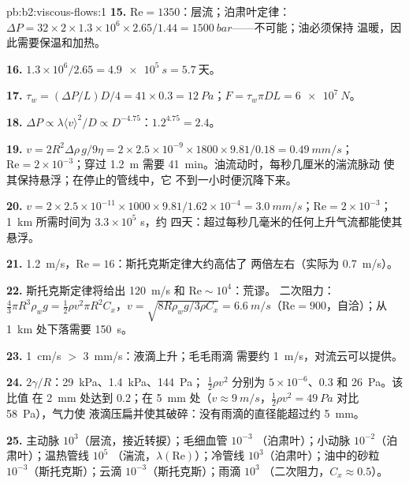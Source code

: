 \begin{solution}{pb:b2:viscous-flows:1}
\textbf{15.} $\mathrm{Re} = 1350$：层流；泊肃叶定律：$\Delta P = 32 \times 2 \times 1.3 \times
10^6 \times 2.65/1.44 = \qty{1500}{bar}$——不可能；油必须保持
温暖，因此需要保温和加热。

\textbf{16.} $1.3 \times 10^6/2.65 = \qty{4.9e5}{s} = \qty{5.7}{\text{天}}$。

\textbf{17.} $\tau_w = (\Delta P/L)D/4 = 41 \times 0.3 = \qty{12}{Pa}$；$F = \tau_w\pi DL =
\qty{6e7}{N}$。

\textbf{18.} $\Delta P \propto \lambda\langle v\rangle^2/D \propto D^{-4.75}$：$1.2^{4.75} = 2.4$。

\textbf{19.} $v = 2R^2\Delta\rho\,g/9\eta = 2 \times 2.5 \times 10^{-9} \times 1800 \times 9.81/
0.18 = \qty{0.49}{mm/s}$；$\mathrm{Re} = 2 \times 10^{-3}$；穿过
\qty{1.2}{m} 需要 \qty{41}{min}。油流动时，每秒几厘米的湍流脉动
使其保持悬浮；在停止的管线中，它
不到一小时便沉降下来。

\textbf{20.} $v = 2 \times 2.5 \times 10^{-11} \times 1000 \times 9.81/1.62 \times 10^{-4} =
\qty{3.0}{mm/s}$；$\mathrm{Re} = 2 \times 10^{-3}$；\qty{1}{km} 所需时间为 $3.3 \times 10^5$ s，约
四天：超过每秒几毫米的任何上升气流都能使其悬浮。

\textbf{21.} \qty{1.2}{m/s}，$\mathrm{Re} = 16$：斯托克斯定律大约高估了
两倍左右（实际为 \qty{0.7}{m/s}）。

\textbf{22.} 斯托克斯定律将给出 \qty{120}{m/s} 和 $\mathrm{Re} \sim 10^4$：荒谬。
二次阻力：$\tfrac43\pi R^3\rho_wg = \tfrac12\rho v^2\pi R^2C_x$，$v = \sqrt{8R
\rho_wg/3\rho C_x} = \qty{6.6}{m/s}$（$\mathrm{Re} = 900$，自洽）；从
\qty{1}{km} 处下落需要 \qty{150}{s}。

\textbf{23.} \qty{1}{cm/s} $>$ \qty{3}{mm/s}：液滴上升；毛毛雨滴
需要约 \qty{1}{m/s}，对流云可以提供。

\textbf{24.} $2\gamma/R$：\qty{29}{kPa}、\qty{1.4}{kPa}、\qty{144}{Pa}；
$\tfrac12\rho v^2$ 分别为 $5 \times 10^{-6}$、$0.3$ 和 \qty{26}{Pa}。该比值
在 \qty{2}{mm} 处达到 $0.2$；在 \qty{5}{mm} 处（$v \approx \qty{9}{m/s}$，$\tfrac12\rho v^2 =
\qty{49}{Pa}$ 对比 \qty{58}{Pa}），气力使
液滴压扁并使其破碎：没有雨滴的直径能超过约 \qty{5}{mm}。

\textbf{25.} 主动脉 $10^3$（层流，接近转捩）；毛细血管 $10^{-3}$
（泊肃叶）；小动脉 $10^{-2}$（泊肃叶）；温热管线 $10^5$
（湍流，$\lambda(\mathrm{Re})$）；冷管线 $10^3$（泊肃叶）；油中的砂粒
$10^{-3}$（斯托克斯）；云滴 $10^{-3}$（斯托克斯）；雨滴 $10^3$
（二次阻力，$C_x \approx 0.5$）。
\end{solution}
